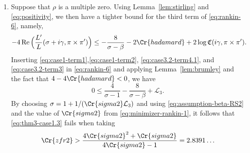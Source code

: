 \documentclass[12pt,reqno]{amsart}
\theoremstyle{remark}
\DeclareMathOperator{\Real}{Re}
\newcommand{\Q}{\mathbb{Q}}
\numberwithin{equation}{section}
\begin{document}
\begin{enumerate}[ leftmargin=1cm]
    \item Suppose that $\rho$ is a multiple zero. Using Lemma~\ref{lem:stirling} and \eqref{eq:positivity}, we then have a tighter bound for the third term of \eqref{eq:rankin-6}, namely,
	\begin{equation}\label{eq:case3.2-term3}
		\begin{aligned}
			- 4\Real\Big(\frac{L'}{L}(\sigma + i\gamma, \pi \times \pi') \Big) \le -\frac{8}{\sigma-\beta} -2\Cr{hadamard}+ 2\log \mathfrak{C}(i\gamma, \pi \times \pi').
		\end{aligned}
	\end{equation}
	Inserting \eqref{eq:case1-term1},\eqref{eq:case1-term2}, \eqref{eq:case3.2-term4.1}, and \eqref{eq:case3.2-term3} in \eqref{eq:rankin-6} and applying Lemma~\ref{lem:brumley} and the fact that $4-4\Cr{hadamard} < 0$, we have
	\begin{equation}\label{eq:thm3-case1.3}
	    0 \le \frac{4}{\sigma-1}-\frac{8}{\sigma-\beta}+ \mathcal{L}_3.  %
	\end{equation}
    By choosing $\sigma = 1+1/(\Cr{sigma2}\mathcal{L}_3)$ and using \eqref{eq:assumption-beta-RS2} and the value of $\Cr{sigma2}$ from \eqref{eq:minimizer-rankin-1}, it follows that \eqref{eq:thm3-case1.3} fails when taking \[
    \Cr{zfr2} > \frac{4\Cr{sigma2}^2+\Cr{sigma2}}{4\Cr{sigma2}-1} = 2.8391\ldots
    \]
	\end{enumerate}

	
	
\end{document}
